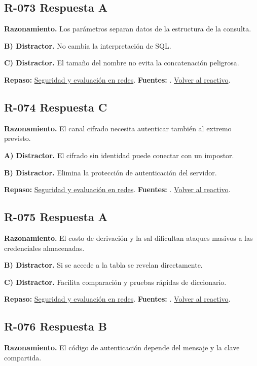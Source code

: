 \subsection*{R-073 \quad Respuesta A}\label{s:R-073}
\textbf{Razonamiento.} Los parámetros separan datos de la estructura de la consulta.

\textbf{B) Distractor. }No cambia la interpretación de SQL.

\textbf{C) Distractor. }El tamaño del nombre no evita la concatenación peligrosa.

\textbf{Repaso:} \hyperref[sec:r3]{Seguridad y evaluación en redes}. \textbf{Fuentes:} \cite{owasp,postgres}. \hyperref[q:R-073]{Volver al reactivo}.\par\medskip

\subsection*{R-074 \quad Respuesta C}\label{s:R-074}
\textbf{Razonamiento.} El canal cifrado necesita autenticar también al extremo previsto.

\textbf{A) Distractor. }El cifrado sin identidad puede conectar con un impostor.

\textbf{B) Distractor. }Elimina la protección de autenticación del servidor.

\textbf{Repaso:} \hyperref[sec:r3]{Seguridad y evaluación en redes}. \textbf{Fuentes:} \cite{tls}. \hyperref[q:R-074]{Volver al reactivo}.\par\medskip

\subsection*{R-075 \quad Respuesta A}\label{s:R-075}
\textbf{Razonamiento.} El costo de derivación y la sal dificultan ataques masivos a las credenciales almacenadas.

\textbf{B) Distractor. }Si se accede a la tabla se revelan directamente.

\textbf{C) Distractor. }Facilita comparación y pruebas rápidas de diccionario.

\textbf{Repaso:} \hyperref[sec:r3]{Seguridad y evaluación en redes}. \textbf{Fuentes:} \cite{nistsecurity,owasp,aes,tls}. \hyperref[q:R-075]{Volver al reactivo}.\par\medskip

\subsection*{R-076 \quad Respuesta B}\label{s:R-076}
\textbf{Razonamiento.} El código de autenticación depende del mensaje y la clave compartida.

